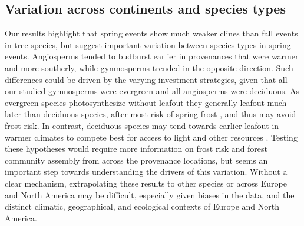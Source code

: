 \documentclass[12pt]{article}
\begin{document}
\subsection{Variation across continents and species types}

Our results highlight that spring events show much weaker clines than fall events in tree species, but suggest important variation between species types in spring events. Angiosperms tended to budburst earlier in provenances that were warmer and more southerly, while gymnosperms trended in the opposite direction. Such differences could be driven by the varying investment strategies, given that all our studied gymnosperms were evergreen and all angiosperms were deciduous. As evergreen species photosynthesize without leafout they generally leafout much later than deciduous species, after most risk of spring frost \citep{panchen14}, and thus may avoid frost risk. In contrast, deciduous species may tend towards earlier leafout in warmer climates to compete best for access to light and other resources \citep{cat2019}. Testing these hypotheses would require more information on frost risk and forest community assembly from across the provenance locations, but seems an important step towards understanding the drivers of this variation. Without a clear mechanism, extrapolating these results to other species or across Europe and North America may be difficult, especially given biases in the data, and the distinct climatic, geographical, and ecological contexts of Europe and North America.  
\end{document}
